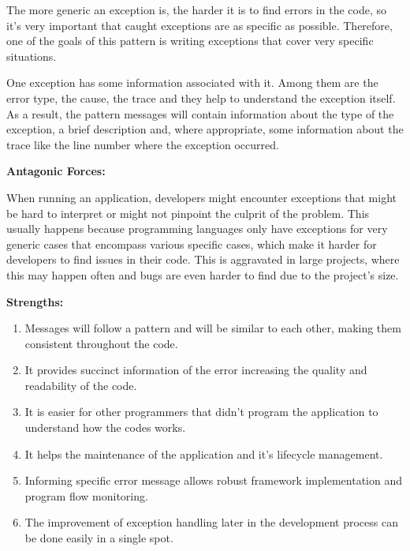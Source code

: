 \documentclass[12pt]{article}
\begin{document}
The more generic an exception is, the harder it is to find errors in the code, so it's very important that caught exceptions are as specific as possible. Therefore, one of the goals of this pattern is writing exceptions that cover very specific situations.
 
One exception has some information associated with it. Among them are the error type, the cause, the trace and they help to understand the exception itself. As a result, the pattern messages will contain information about the type of the exception, a brief description and, where appropriate, some information about the trace like the line number where the exception occurred.
\newline

\begin{flushleft}
\textbf{Antagonic Forces:} 
\end{flushleft} 
When running an application, developers might encounter exceptions that might be hard to interpret or might not pinpoint the culprit of the problem. This usually happens because programming languages only have exceptions for very generic cases that encompass various specific cases, which make it harder for developers to find issues in their code. This is aggravated in large projects, where this may happen often and bugs are even harder to find due to the project's size.  \newline


\begin{flushleft}
\textbf{Strengths:} 
\end{flushleft}

\begin{enumerate}
\item Messages will follow a pattern and will be similar to each other, making them consistent throughout the code.

\item It provides succinct information of the error increasing the quality and readability of the code.

\item It is easier for other programmers that didn’t program the application to understand how the codes works.

\item It helps the maintenance of the application and it's lifecycle management.

\item Informing specific error message allows robust framework implementation and program flow monitoring.

\item The improvement of exception handling later in the development process can be done easily in a single spot. \\ \\ \newline

\end{enumerate}
\end{document}
